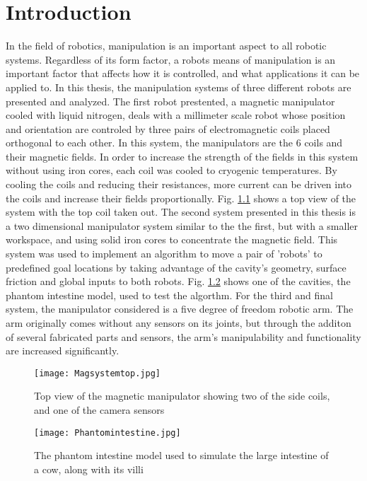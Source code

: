 
\chapter[Introduction]{Introduction}
\label{chap-intro}

In the field of robotics, manipulation is an important aspect to all robotic systems. Regardless of its form factor, a robots means of manipulation is an important factor that affects how it is controlled, and what applications it can be applied to. In this thesis, the manipulation systems of three different robots are presented and analyzed. The first robot prestented, a magnetic manipulator cooled with liquid nitrogen, deals with a millimeter scale robot whose position and orientation are controled by three pairs of electromagnetic coils placed orthogonal to each other. In this system, the manipulators are the 6 coils and their magnetic fields. In order to increase the strength of the fields in this system without using iron cores, each coil was cooled to cryogenic temperatures.  By cooling the coils and reducing their resistances, more current can be driven into the coils and increase their fields proportionally.  Fig. \ref{MagTopPic} shows a top view of the system with the top coil taken out.  The second system presented in this thesis is a two dimensional manipulator system similar to the the first, but with a smaller workspace, and using solid iron cores to concentrate the magnetic field. This system was used to implement an algorithm to move a pair of 'robots' to predefined goal locations by taking advantage of the cavity's geometry, surface friction and global inputs to both robots. Fig. \ref{Intestine} shows one of the cavities, the phantom intestine model, used to test the algorthm.  For the third and final system, the manipulator considered is a five degree of freedom robotic arm. The arm originally comes without any sensors on its joints, but through the additon of several fabricated parts and sensors, the arm's manipulability and functionality are increased significantly. 


\begin{figure}
	\texttt{[image: Magsystemtop.jpg]}
	\caption{Top view of the magnetic manipulator showing  two of the side coils, and one of the camera sensors}
	\label{MagTopPic}
\end{figure}  
\begin{figure}
	\texttt{[image: Phantomintestine.jpg]}
	\caption{The phantom intestine model used to simulate the large intestine of a cow, along with its villi}
	\label{Intestine}
\end{figure} 